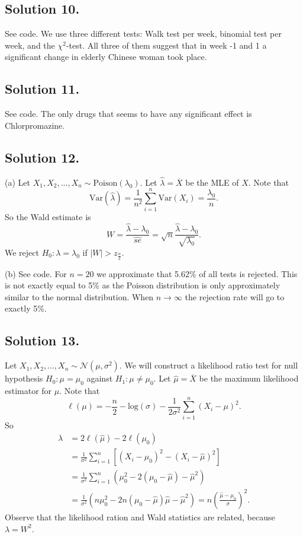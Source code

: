 \subsection*{Solution 10.}

See code.
We use three different tests: Walk test per week, binomial test per week, and the $\chi^2$-test.
All three of them suggest that in week -1 and 1 a significant change in elderly Chinese woman took place.


\subsection*{Solution 11.}

See code.
The only drugs that seems to have any significant effect is Chlorpromazine.


\subsection*{Solution 12.}

(a) Let $X_1, X_2, ..., X_n \sim \mathrm{Poison}(\lambda_0)$.
Let $\hat{\lambda} = \overline{X}$ be the MLE of $X$.
Note that
$$
\mathrm{Var}(\hat{\lambda}) = \frac{1}{n^2} \sum_{i=1}^n \mathrm{Var}(X_i) = \frac{\lambda_0}{n}.
$$
So the Wald estimate is
$$
W = \frac{\hat{\lambda} - \lambda_0}{\hat{se}} = \sqrt{n} \frac{\hat{\lambda} - \lambda_0}{\sqrt{\lambda_0}}.
$$
We reject $H_0: \lambda = \lambda_0$ if $|W| > z_{\frac{\alpha}{2}}$.

(b) See code.
For $n = 20$ we approximate that 5.62\% of all tests is rejected.
This is not exactly equal to 5\% as the Poisson distribution is only approximately similar to the normal distribution.
When $n \to \infty$ the rejection rate will go to exactly 5\%.


\subsection*{Solution 13.}

Let $X_1, X_2, ..., X_n \sim \mathcal{N}(\mu, \sigma^2)$.
We will construct a likelihood ratio test for null hypothesis $H_0: \mu = \mu_0$ against $H_1: \mu \neq \mu_0$.
Let $\hat{\mu} = \overline{X}$ be the maximum likelihood estimator for $\mu$.
Note that
$$
\ell(\mu) = -\frac{n}{2} - \mathrm{log}(\sigma) - \frac{1}{2\sigma^2} \sum_{i=1}^n (X_i - \mu)^2.
$$
So
\begin{equation*}
\begin{split}
\lambda &= 2\ell(\hat{\mu}) - 2\ell(\mu_0) \\
    &= \frac{1}{\sigma^2} \sum_{i=1}^n \left[ (X_i - \mu_0)^2 - (X_i - \hat{\mu})^2 \right] \\
    &= \frac{1}{\sigma^2} \sum_{i=1}^n (\mu_0^2 - 2(\mu_0 - \hat{\mu}) - \hat{\mu}^2) \\
    &= \frac{1}{\sigma^2} (n\mu_0^2 - 2n(\mu_0 - \hat{\mu})\hat{\mu} - \hat{\mu}^2)
    = n \left(\frac{\hat{\mu} - \mu_0}{\sigma}\right)^2.
\end{split}
\end{equation*}
Observe that the likelihood ration and Wald statistics are related, because $\lambda = W^2$.

